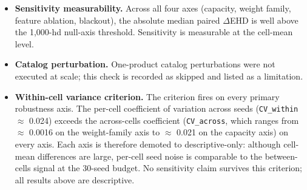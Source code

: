\begin{itemize}
 \item \textbf{Sensitivity measurability.} Across all four axes (capacity, weight family, feature ablation, blackout), the absolute median paired $\Delta$EHD is well above the 1,000-hd null-axis threshold. Sensitivity is measurable at the cell-mean level.
 \item \textbf{Catalog perturbation.} One-product catalog perturbations were not executed at scale; this check is recorded as skipped and listed as a limitation.
 \item \textbf{Within-cell variance criterion.} The criterion fires on every primary robustness axis. The per-cell coefficient of variation across seeds (\texttt{CV\_within} $\approx$ 0.024) exceeds the across-cells coefficient (\texttt{CV\_across}, which ranges from $\approx$ 0.0016 on the weight-family axis to $\approx$ 0.021 on the capacity axis) on every axis. Each axis is therefore demoted to descriptive-only: although cell-mean differences are large, per-cell seed noise is comparable to the between-cells signal at the 30-seed budget. No sensitivity claim survives this criterion; all results above are descriptive.
\end{itemize}
